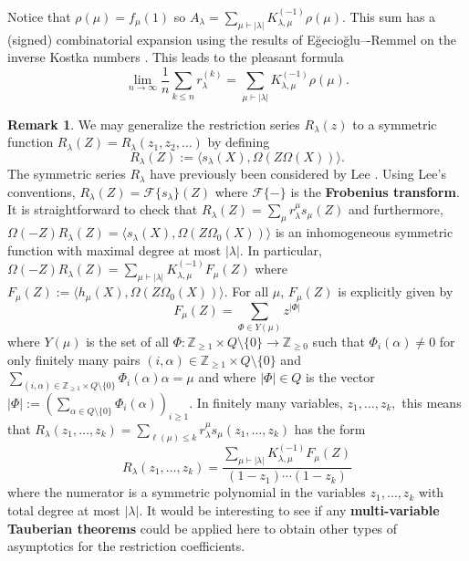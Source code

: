 \documentclass[12pt,reqno]{amsart}
\theoremstyle{definition}
\newtheorem{remark}{Remark}
\begin{document}
Notice that $\rho(\mu) = f_{\mu}(1)$ so $A_{\lambda} = \sum_{\mu \vdash |\lambda|} K_{\lambda,\mu}^{(-1)} \rho(\mu).$ This sum has a (signed) combinatorial expansion using the results of Eğecioğlu–-Remmel on the inverse Kostka numbers \cite{ER90}. This leads to the pleasant formula
    $$\lim_{n \rightarrow \infty} \frac{1}{n} \sum_{k \leq n} r_{\lambda}^{(k)} = \sum_{\mu \vdash |\lambda|} K_{\lambda,\mu}^{(-1)} \rho(\mu).$$



\begin{remark}
    We may generalize the restriction series $R_{\lambda}(z)$ to a symmetric function $R_{\lambda}(Z) = R_{\lambda}(z_1,z_2,\ldots)$ by defining 
    $$R_{\lambda}(Z):= \langle s_{\lambda}(X), \Omega(Z\Omega(X)) \rangle.$$ The symmetric series $R_{\lambda}$ have previously been considered by Lee \cite{Lee24}. Using Lee's conventions, $R_{\lambda}(Z) = \mathcal{F}\{s_{\lambda} \}(Z)$ where $\mathcal{F}\{ - \}$ is the \textbf{Frobenius transform}. It is straightforward to check that $R_{\lambda}(Z) = \sum_{\mu} r_{\lambda}^{\mu} s_{\mu}(Z)$ and furthermore, $\Omega(-Z)R_{\lambda}(Z) = \langle s_{\lambda}(X), \Omega(Z\Omega_0(X)) \rangle$ is an inhomogeneous symmetric function with maximal degree at most $|\lambda|.$ In particular, 
    $\Omega(-Z)R_{\lambda}(Z) = \sum_{\mu \vdash |\lambda|} K_{\lambda,\mu}^{(-1)} F_{\mu}(Z)$ where 
    $F_{\mu}(Z):= \langle h_{\mu}(X), \Omega(Z \Omega_0(X)) \rangle .$ For all $\mu$, $F_{\mu}(Z)$ is explicitly given by 
    $$F_{\mu}(Z) = \sum_{\Phi \in Y(\mu)} z^{|\Phi|}$$ where 
    $Y(\mu)$ is the set of all $\Phi: \mathbb{Z}_{\geq 1} \times Q\setminus \{0\} \rightarrow \mathbb{Z}_{\geq 0}$ such that $\Phi_i(\alpha) \neq 0$ for only finitely many pairs $(i,\alpha) \in \mathbb{Z}_{\geq 1} \times Q\setminus \{0\} $ and $\sum_{(i,\alpha) \in \mathbb{Z}_{\geq 1} \times Q\setminus \{0\}} \Phi_i(\alpha) \alpha = \mu$ and where $|\Phi| \in Q$ is the vector $|\Phi|:= \left( \sum_{\alpha \in Q\setminus \{0\} }\Phi_i(\alpha) \right)_{i \geq 1}.$ In finitely many variables, $z_1,\ldots, z_k,$ this means that 
    $R_{\lambda}(z_1,\ldots,z_k) = \sum_{\ell(\mu) \leq k} r_{\lambda}^{\mu} s_{\mu}(z_1,\ldots,z_k)$ has the form $$R_{\lambda}(z_1,\ldots,z_k)= \frac{\sum_{\mu \vdash |\lambda|} K_{\lambda,\mu}^{(-1)} F_{\mu}(Z)}{(1-z_1)\cdots (1-z_k)}$$ where the numerator is a symmetric polynomial in the variables $z_1,\ldots,z_k$ with total degree at most $|\lambda|.$ It would be interesting to see if any \textbf{multi-variable Tauberian theorems} could be applied here to obtain other types of asymptotics for the restriction coefficients. 
\end{remark}








\printbibliography
\end{document}
